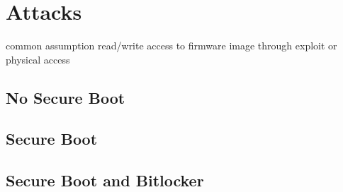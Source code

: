
\chapter{Attacks}

common assumption read/write access to firmware image through exploit or physical access

\section{No Secure Boot}

\section{Secure Boot}

\section{Secure Boot and Bitlocker}



